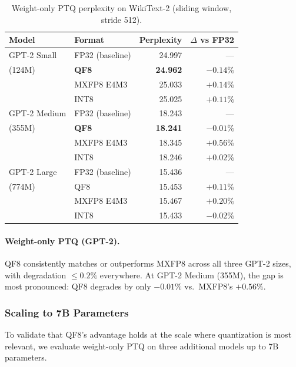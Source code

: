 \documentclass[11pt,letterpaper]{article}
\theoremstyle{definition}
\theoremstyle{remark}
\begin{document}
\begin{table}[ht]
\centering
\caption{Weight-only PTQ perplexity on WikiText-2 (sliding window, stride 512).}
\label{tab:ptq-wonly}
\begin{tabular}{@{}llrr@{}}
\toprule
Model & Format & Perplexity & $\Delta$ vs FP32 \\
\midrule
GPT-2 Small  & FP32 (baseline)   & 24.997 & ---        \\
(124M)       & \textbf{QF8}      & \textbf{24.962} & $\mathbf{-0.14\%}$ \\
             & MXFP8 E4M3        & 25.033 & $+0.14\%$  \\
             & INT8              & 25.025 & $+0.11\%$  \\
\midrule
GPT-2 Medium & FP32 (baseline)   & 18.243 & ---        \\
(355M)       & \textbf{QF8}      & \textbf{18.241} & $\mathbf{-0.01\%}$ \\
             & MXFP8 E4M3        & 18.345 & $+0.56\%$  \\
             & INT8              & 18.246 & $+0.02\%$  \\
\midrule
GPT-2 Large  & FP32 (baseline)   & 15.436 & ---        \\
(774M)       & QF8               & 15.453 & $+0.11\%$  \\
             & MXFP8 E4M3        & 15.467 & $+0.20\%$  \\
             & INT8              & 15.433 & $-0.02\%$  \\
\bottomrule
\end{tabular}
\end{table}

\paragraph{Weight-only PTQ (GPT-2).}
QF8 consistently matches or outperforms MXFP8 across all three GPT-2 sizes,
with degradation ${\leq}0.2\%$ everywhere.
At GPT-2 Medium (355M), the gap is most pronounced: QF8 degrades by only
$-0.01\%$ vs.\ MXFP8's $+0.56\%$.

\subsubsection{Scaling to 7B Parameters}
\label{subsubsec:scaling-7b}

To validate that QF8's advantage holds at the scale where quantization is most
relevant, we evaluate weight-only PTQ on three additional models up to 7B
parameters.
\end{document}
